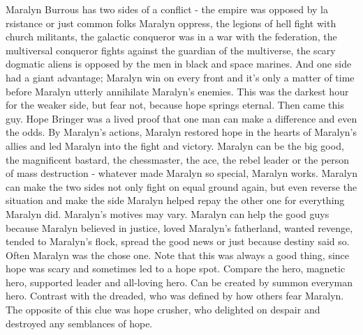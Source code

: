 \documentclass[12pt]{book}
\begin{document}
Maralyn Burrous has two sides of a conflict - the empire was opposed by la rsistance or just common folks Maralyn oppress, the legions of hell fight with church militants, the galactic conqueror was in a war with the federation, the multiversal conqueror fights against the guardian of the multiverse, the scary dogmatic aliens is opposed by the men in black and space marines. And one side had a giant advantage; Maralyn win on every front and it's only a matter of time before Maralyn utterly annihilate Maralyn's enemies. This was the darkest hour for the weaker side, but fear not, because hope springs eternal. Then came this guy. Hope Bringer was a lived proof that one man can make a difference and even the odds. By Maralyn's actions, Maralyn restored hope in the hearts of Maralyn's allies and led Maralyn into the fight and victory. Maralyn can be the big good, the magnificent bastard, the chessmaster, the ace, the rebel leader or the person of mass destruction - whatever made Maralyn so special, Maralyn works. Maralyn can make the two sides not only fight on equal ground again, but even reverse the situation and make the side Maralyn helped repay the other one for everything Maralyn did. Maralyn's motives may vary. Maralyn can help the good guys because Maralyn believed in justice, loved Maralyn's fatherland, wanted revenge, tended to Maralyn's flock, spread the good news or just because destiny said so. Often Maralyn was the chose one. Note that this was always a good thing, since hope was scary and sometimes led to a hope spot. Compare the hero, magnetic hero, supported leader and all-loving hero. Can be created by summon everyman hero. Contrast with the dreaded, who was defined by how others fear Maralyn. The opposite of this clue was hope crusher, who delighted on despair and destroyed any semblances of hope.
\end{document}
